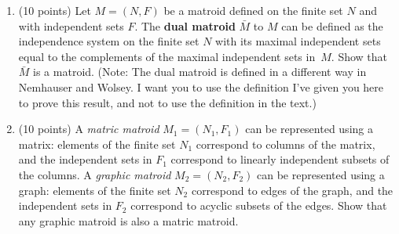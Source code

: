 \begin{enumerate}
\begin{enumerate}
      \item (10 points)
        Let $M=(N,F)$ be a matroid defined on the finite set $N$ and with
        independent sets $F$.
        The {\bf dual matroid} $\bar{M}$ 
        to $M$ can be defined as the independence
        system on the finite set $N$ with its maximal independent sets
        equal to the complements of the maximal independent sets in~$M$.
        Show that $\bar{M}$ is a matroid.
        (Note: The dual matroid is defined in a different way in Nemhauser
        and Wolsey. I want you to use the definition I've given you here
        to prove this result, and not to use the definition in the text.)
      \item (10 points)
        A {\em matric matroid} $M_1=(N_1,F_1)$
        can be represented using a matrix:
        elements of the finite set $N_1$ correspond to columns of the matrix,
        and the independent sets in $F_1$ correspond to
        linearly independent subsets of the columns.
        A {\em graphic matroid} $M_2=(N_2,F_2)$ can be represented
        using a graph:
        elements of the finite set $N_2$ correspond to edges of the graph,
        and the independent sets in $F_2$ correspond to acyclic subsets
        of the edges.
        Show that any graphic matroid is also a matric matroid.
    \end{enumerate}


\end{enumerate}
